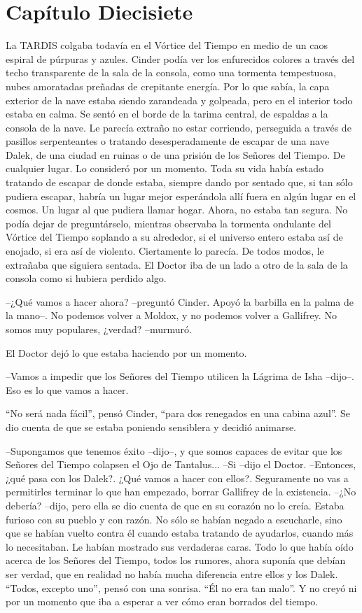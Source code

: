 \chapter*{Capítulo Diecisiete}

La TARDIS colgaba todavía en el Vórtice del Tiempo en medio de un caos espiral de púrpuras y azules. Cinder podía ver los enfurecidos colores a través del techo transparente de la sala de la consola, como una tormenta tempestuosa, nubes amoratadas preñadas de crepitante energía. Por lo que sabía, la capa exterior de la nave estaba siendo zarandeada y golpeada, pero en el interior todo estaba en calma.
Se sentó en el borde de la tarima central, de espaldas a la consola de la nave. Le parecía extraño no estar corriendo, perseguida a través de pasillos serpenteantes o tratando desesperadamente de escapar de una nave Dalek, de una ciudad en ruinas o de una prisión de los Señores del Tiempo. De cualquier lugar. Lo consideró por un momento. Toda su vida había estado tratando de escapar de donde estaba, siempre dando por sentado que, si tan sólo pudiera escapar, habría un lugar mejor esperándola allí fuera en algún lugar en el cosmos. Un lugar al que pudiera llamar hogar.
Ahora, no estaba tan segura. No podía dejar de preguntárselo, mientras observaba la tormenta ondulante del Vórtice del Tiempo soplando a su alrededor, si el universo entero estaba así de enojado, si era así de violento. Ciertamente lo parecía.
De todos modos, le extrañaba que siguiera sentada.
El Doctor iba de un lado a otro de la sala de la consola como si hubiera perdido algo.

--¿Qué vamos a hacer ahora? --preguntó Cinder. Apoyó la barbilla en la palma de la mano--. No podemos volver a Moldox, y no podemos volver a Gallifrey. No somos muy populares, ¿verdad? --murmuró.

El Doctor dejó lo que estaba haciendo por un momento. 

--Vamos a impedir que los Señores del Tiempo utilicen la Lágrima de Isha --dijo--. Eso es lo que vamos a hacer.

``No será nada fácil'', pensó Cinder, ``para dos renegados en una cabina azul''. Se dio cuenta de que se estaba poniendo sensiblera y decidió animarse. 

--Supongamos que tenemos éxito --dijo--, y que somos capaces de evitar que los Señores del Tiempo colapsen el Ojo de Tantalus...
--Si --dijo el Doctor.
--Entonces, ¿qué pasa con los Dalek?. ¿Qué vamos a hacer con ellos?. Seguramente no vas a permitirles terminar lo que han empezado, borrar Gallifrey de la existencia.
--¿No debería? --dijo, pero ella se dio cuenta de que en su corazón no lo creía. Estaba furioso con su pueblo y con razón. No sólo se habían negado a escucharle, sino que se habían vuelto contra él cuando estaba tratando de ayudarlos, cuando más lo necesitaban. Le habían mostrado sus verdaderas caras.
Todo lo que había oído acerca de los Señores del Tiempo, todos los rumores, ahora suponía que debían ser verdad, que en realidad no había mucha diferencia entre ellos y los Dalek.
``Todos, excepto uno'', pensó con una sonrisa. ``Él no era tan malo''. Y no creyó ni por un momento que iba a esperar a ver cómo eran borrados del tiempo.

